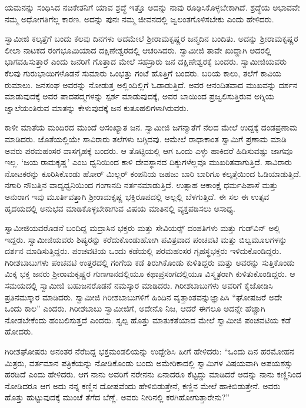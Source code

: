  ಯಮನನ್ನು ಸಂಧಿಸಿದ ನಚಿಕೇತನಿಗೆ ಯಾವ ಶ್ರದ್ಧೆ ಇತ್ತೊ ಅದನ್ನು ನಾವು ರೂಢಿಸಿಕೊಳ್ಳಬೇಕಾಗಿದೆ. ಶ್ರದ್ಧೆಯ ಅಭಾವವೇ ನಮ್ಮ ಅಧೋಗತಿಗೆಲ್ಲ ಕಾರಣ. ಅದನ್ನು ಪುನಃ ನಮ್ಮ ಜೀವನದಲ್ಲಿ ಜ್ವಲಂತಗೊಳಿಸಬೇಕು ಎಂದು ಹೇಳಿದರು. 

 ಸ್ವಾಮೀಜಿ ಕಲ್ಕತ್ತೆಗೆ ಬಂದು ಕೆಲವು ದಿನಗಳು ಆದಮೇಲೆ ಶ‍್ರೀರಾಮಕೃಷ್ಣರ ಜನ್ಮದಿನ ಬಂದಿತು. ಅದನ್ನು ಶ‍್ರೀರಾಮಕೃಷ್ಣರ ಲೀಲಾ ನಾಟಕದ ರಂಗಭೂಮಿಯಾದ ದಕ್ಷಿಣೇಶ್ವರದಲ್ಲಿ ಆಚರಿಸಿದರು. ಸ್ವಾಮೀಜಿ ತಾವೇ ಖುದ್ದಾಗಿ ಅದರಲ್ಲಿ ಭಾಗವಹಿಸುತ್ತಾರೆ ಎಂದು ಜನರಿಗೆ ಗೊತ್ತಾದ ಮೇಲೆ ಸಹಸ್ರಾರು ಜನ ದಕ್ಷಿಣೇಶ್ವರಕ್ಕೆ ಬಂದರು. ಸ್ವಾಮೀಜಿಯವರು ಕೆಲವು ಗುರುಭಾಯಿಗಳೊಡನೆ ಸುಮಾರು ಒಂಭತ್ತು ಗಂಟೆ ಹೊತ್ತಿಗೆ ಬಂದರು. ಬರಿಯ ಕಾಲು, ತಲೆಗೆ ಕಾವಿಯ ರುಮಾಲು. ಜನಸಂಘ ಅವರನ್ನು ನೋಡುತ್ತ ಅಲ್ಲಿಂದಿಲ್ಲಿಗೆ ಓಡಾಡುತ್ತಿದೆ. ಅವರ ಆನಂದಿತವಾದ ಮುಖವನ್ನು ದರ್ಶನ ಮಾಡುವುದಕ್ಕೆ ಅವರ ಪಾದಪದ್ಮಗಳನ್ನು ಸ್ಪರ್ಶ ಮಾಡುವುದಕ್ಕೆ, ಅವರ ಬಾಯಿಂದ ಪ್ರಜ್ವಲಿಸುತ್ತಿರುವ ಅಗ್ನಿಯ ಜ್ವಾಲೆಯಂತಿರುವ ಮಾತನ್ನು ಕೇಳುವುದಕ್ಕೆ ಜನ ಕುತೂಹಲಿಗಳಾಗಿರುವರು. 

 ಕಾಳೀ ಮಾತೆಯ ಮಂದಿರದ ಮುಂದೆ ಅಸಂಖ್ಯಾತ ಜನ. ಸ್ವಾಮೀಜಿ ಜಗನ್ಮಾತೆಗೆ ನೆಲದ ಮೇಲೆ ಉದ್ದಕ್ಕೆ ದಂಡಪ್ರಣಾಮ ಮಾಡಿದರು. ಜೊತೆಯಲ್ಲಿಯೇ ಸಾವಿರಾರು ತಲೆಗಳು ಬಗ್ಗಿದವು. ಆಮೇಲೆ ರಾಧಾಕಾಂತ ಸ್ವಾಮಿಗೆ ಪ್ರಣಾಮ ಮಾಡಿ ಅವರು ಪರಮಹಂಸರ ವಾಸಗೃಹಕ್ಕೆ ಬಂದರು. ಆ ತೊಟ್ಟಿಯಲ್ಲಿ ಆಗ ಒಂದು ಎಳ್ಳು ಹಾಕಿದರೆ ಹಿಡಿಸುವಷ್ಟು ಜಾಗವೂ ಇಲ್ಲ. ‘ಜಯ ರಾಮಕೃಷ್ಣ’ ಎಂಬ ಧ್ವನಿಯಿಂದ ಕಾಳಿ ದೇವಸ್ಥಾನದ ದಿಕ್ಕುಗಳೆಲ್ಲವೂ ಮುಖರಿತವಾಗುತ್ತಿದೆ. ಸಾವಿರಾರು ನೋಟಕರನ್ನು ಕೂರಿಸಿಕೊಂಡು ಹೋರ್ ಮಿಲ್ಲರ್ ಕಂಪನಿಯ ಜಹಜು ಬಾರಿ ಬಾರಿಗೂ ಕಲ್ಕತ್ತೆಯಿಂದ ಓಡಿಯಾಡುತ್ತಿದೆ. ನಗಾರಿ ನೌಬತ್ತಿನ ವಾದ್ಯಧ್ವನಿಯಿಂದ ಗಂಗಾನದಿ ನರ್ತನಮಾಡುತ್ತಿದೆ. ಉತ್ಸಾಹ ಆಕಾಂಕ್ಷೆ ಧರ್ಮಪಿಪಾಸೆ ಮತ್ತು ಅನುರಾಗ ಇವು ಮೂರ್ತಿವತ್ತಾಗಿ ಶ‍್ರೀರಾಮಕೃಷ್ಣ ಭಕ್ತಿರೂಪದಲ್ಲಿ ಅಲ್ಲಲ್ಲಿ ಬೆಳಗುತ್ತಿದೆ. ಈ ಸಲ ಈ ಉತ್ಸವ ಹೃದಯದಲ್ಲಿ ಅನುಭವ ಮಾಡಿಕೊಳ್ಳಬೇಕಾಗುವ ವಿಷಯ ಮಾತಿನಲ್ಲಿ ವ್ಯಕ್ತಪಡಿಸಲು ಅಸಾಧ್ಯ. 

 ಸ್ವಾಮೀಜಿಯವರೊಡನೆ ಬಂದಿದ್ದ ಮದ್ರಾಸಿನ ಭಕ್ತರು ಮತ್ತು ಸೇವಿಯರ್ಸ್‍‍ ದಂಪತಿಗಳು ಮತ್ತು ಗುಡ್‍ವಿನ್ ಅಲ್ಲಿ ಇದ್ದರು. ಸ್ವಾಮೀಜಿಯವರು ಶಿಷ್ಯರನ್ನು ಕರೆದುಕೊಂಡುಹೋಗಿ ಪವಿತ್ರವಾದ ಪಂಚವಟಿ ಮತ್ತು ಬಿಲ್ವಮೂಲಗಳನ್ನು ದರ್ಶನ ಮಾಡಿಸುತ್ತಿದ್ದರು. ಪಂಚವಟಿಯ ಒಂದು ಕಡೆಯಲ್ಲಿ ಪರಮಹಂಸರ ಗೃಹಸ್ಥಭಕ್ತರು ಇಳಿದುಕೊಂಡಿದ್ದರು. ಗಿರೀಶಬಾಬುಗಳು ಪಂಚವಟಿ ಉತ್ತರದಲ್ಲಿ ಗಂಗೆಯ ಕಡೆ ತಿರುಗಿಕೊಂಡು ಕುಳಿತಿದ್ದರು ಮತ್ತು ಅವರನ್ನು ಸುತ್ತಿಕೊಂಡು ಮಿಕ್ಕ ಭಕ್ತ ಜನರು ಶ‍್ರೀರಾಮಕೃಷ್ಣರ ಗುಣಗಾನದಲ್ಲಿಯೂ ಕಥಾಪ್ರಸಂಗದಲ್ಲಿಯೂ ವಿಸ್ಮೃತರಾಗಿ ಕುಳಿತುಕೊಂಡಿದ್ದರು. ಆ ಸಮಯದಲ್ಲಿ ಸ್ವಾಮೀಜಿ ಬಹುಜನರೊಡನೆ ನಮಸ್ಕಾರ ಮಾಡಿದರು. ಗಿರೀಶಬಾಬುಗಳು ಅವರಿಗೆ ಕೈಜೋಡಿಸಿ ಪ್ರತಿನಮಸ್ಕಾರ ಮಾಡಿದರು. ಸ್ವಾಮೀಜಿ ಗಿರೀಶಬಾಬುಗಳಿಗೆ ಹಿಂದಿನ ವೃತ್ತಾಂತವನ್ನುಜ್ಞಾಪಿಸಿ “ಘೋಷಜರೆ ಅದೇ ಒಂದು ಕಾಲ” ಎಂದರು. ಗಿರೀಶಬಾಬು ಸ್ವಾಮೀಜಿಗೆ, ಅದೇನೊ ನಿಜ, ಆದರೆ ಈಗಲೂ ಅದನ್ನೇ ಹೆಚ್ಚಾಗಿ ನೋಡಬೇಕೆಂದು ಹಂಬಲಿಸುತ್ತದೆ ಎಂದರು. ಸ್ವಲ್ಪ ಹೊತ್ತು ಮಾತುಕತೆಯಾದ ಮೇಲೆ ಸ್ವಾಮೀಜಿ ಪಂಚವಟಿಯ ಕಡೆ ಹೋದರು. 

 ಗಿರೀಶಘೋಷರು ಅನಂತರ ನೆರೆದಿದ್ದ ಭಕ್ತಮಂಡಲಿಯನ್ನು ಉದ್ದೇಶಿಸಿ ಹೀಗೆ ಹೇಳಿದರು: “ಒಂದು ದಿನ ಹರಮೋಹನ ಮಿತ್ರರು, ವರ್ತಮಾನ ಪತ್ರಿಕೆಯನ್ನು ನೋಡಿಕೊಂಡು ಬಂದು ಅಮೇರಿಕಾದಲ್ಲಿ ಸ್ವಾಮಿಗಳ ವಿಷಯವಾಗಿ ಅಪಯಶಸ್ಸು ಹರಡಿದೆ ಎಂದು ಹೇಳಿದರು. ಆಗ ನಾನು ಅವರಿಗೆ ನರೇನನು ಏನಾದರೂ ಕೆಟ್ಟದ್ದು ಮಾಡಿದರೆ ಅದನ್ನು ನಾನು ಕಣ್ಣಿನಿಂದ ನೋಡಿದರೂ ಆಗ ಅದು ನನ್ನ ಕಣ್ಣಿನ ದೋಷವೆಂದು ಹೇಳಿಬಿಡುತ್ತೇನೆ, ಕಣ್ಣಿನ ಮೇಲೆ ಹಾಕಿಬಿಡುತ್ತೇನೆ. ಅವರು ಹೊತ್ತು ಹುಟ್ಟುವುದಕ್ಕೆ ಮುಂಚೆ ತೆಗೆದ ಬೆಣ್ಣೆ. ಅವರು ನೀರಿನಲ್ಲಿ ಕರಗಿಹೋಗುತ್ತಾರೇನು?” 

